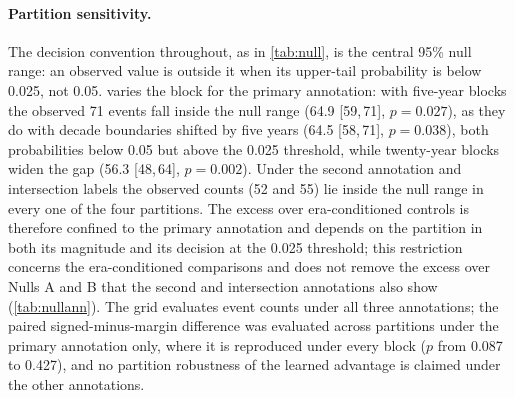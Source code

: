 \documentclass[11pt]{article}
\newcommand{\ci}[2]{[#1,\,#2]}
\begin{document}
\paragraph{Partition sensitivity.} The decision convention throughout, as in \cref{tab:null},
is the central 95\% null range: an observed value is outside it when its upper-tail probability
is below 0.025, not 0.05.  varies the block for the primary annotation: with
five-year blocks the observed 71 events fall inside the null range (64.9 \ci{59}{71}, $p=0.027$),
as they do with decade boundaries shifted by five years (64.5 \ci{58}{71}, $p=0.038$), both
probabilities below 0.05 but above the 0.025 threshold, while twenty-year blocks widen the gap
(56.3 \ci{48}{64}, $p=0.002$). Under the second annotation and intersection labels the observed
counts (52 and 55) lie inside the null range in every one of the four partitions. The excess over
era-conditioned controls is therefore confined to the primary annotation and depends on the
partition in both its magnitude and its decision at the 0.025 threshold; this restriction concerns the era-conditioned comparisons and does not remove the excess
over Nulls A and B that the second and intersection annotations also show (\cref{tab:nullann}).
The grid evaluates event counts under all three annotations; the paired signed-minus-margin
difference was evaluated across partitions under the primary annotation only, where it is
reproduced under every block ($p$ from 0.087 to 0.427), and no partition robustness of the learned
advantage is claimed under the other annotations.
\end{document}
